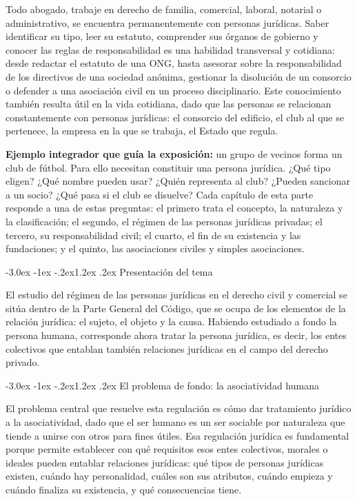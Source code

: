 \documentclass[12pt,oneside]{book}
\makeatletter
\renewcommand\section{\@startsection{section}{1}{\z@}%
  {-3.0ex \@plus -1ex \@minus -.2ex}{1.2ex \@plus .2ex}%
  {\normalfont\large\bfseries\color{acento}}}
\makeatother
\begin{document}
Todo abogado, trabaje en derecho de familia, comercial, laboral, notarial o administrativo, se encuentra permanentemente con personas jurídicas. Saber identificar su tipo, leer su estatuto, comprender sus órganos de gobierno y conocer las reglas de responsabilidad es una habilidad transversal y cotidiana: desde redactar el estatuto de una ONG, hasta asesorar sobre la responsabilidad de los directivos de una sociedad anónima, gestionar la disolución de un consorcio o defender a una asociación civil en un proceso disciplinario. Este conocimiento también resulta útil en la vida cotidiana, dado que las personas se relacionan constantemente con personas jurídicas: el consorcio del edificio, el club al que se pertenece, la empresa en la que se trabaja, el Estado que regula.

\textbf{Ejemplo integrador que guía la exposición:} un grupo de vecinos forma un club de fútbol. Para ello necesitan constituir una persona jurídica. ¿Qué tipo eligen? ¿Qué nombre pueden usar? ¿Quién representa al club? ¿Pueden sancionar a un socio? ¿Qué pasa si el club se disuelve? Cada capítulo de esta parte responde a una de estas preguntas: el primero trata el concepto, la naturaleza y la clasificación; el segundo, el régimen de las personas jurídicas privadas; el tercero, su responsabilidad civil; el cuarto, el fin de su existencia y las fundaciones; y el quinto, las asociaciones civiles y simples asociaciones.


\section{Presentación del tema}

El estudio del régimen de las personas jurídicas en el derecho civil y comercial se sitúa dentro de la Parte General del Código, que se ocupa de los elementos de la relación jurídica: el sujeto, el objeto y la causa. Habiendo estudiado a fondo la persona humana, corresponde ahora tratar la persona jurídica, es decir, los entes colectivos que entablan también relaciones jurídicas en el campo del derecho privado.

\section{El problema de fondo: la asociatividad humana}

El problema central que resuelve esta regulación es cómo dar tratamiento jurídico a la asociatividad, dado que el ser humano es un ser sociable por naturaleza que tiende a unirse con otros para fines útiles. Esa regulación jurídica es fundamental porque permite establecer con qué requisitos esos entes colectivos, morales o ideales pueden entablar relaciones jurídicas: qué tipos de personas jurídicas existen, cuándo hay personalidad, cuáles son sus atributos, cuándo empieza y cuándo finaliza su existencia, y qué consecuencias tiene.
\end{document}

